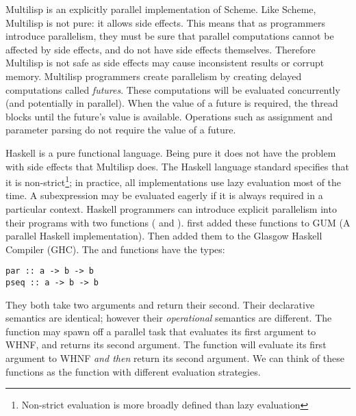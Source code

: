 Multilisp \citep*{halstead:1984:multilisp,halstead:1985:multilisp} is an
explicitly parallel implementation of Scheme.
Like Scheme, Multilisp is not pure: it allows side effects.
This means that as programmers introduce parallelism, they must be sure that
parallel computations cannot be affected by side effects,
and do not have side effects themselves.
Therefore Multilisp is not safe as side effects may cause inconsistent
results or corrupt memory.
Multilisp programmers create parallelism by creating delayed computations
called \emph{futures}.
These computations will be evaluated concurrently
(and potentially in parallel).
When the value of a future is required,
the thread blocks until the future's value is available.
Operations such as assignment and parameter parsing do not require the
value of a future.

Haskell is a pure functional language.
Being pure it does not have the problem with side effects that Multilisp
does.
The Haskell language standard specifies that it is non-strict\footnote{
    Non-strict evaluation is more broadly defined than lazy evaluation};
in practice, all implementations use lazy evaluation most of the time.
A subexpression may be evaluated eagerly if it is always required in a
particular context.
Haskell programmers can introduce explicit parallelism into their programs
with two functions ( and ).
\citet{gph:gum}
first added these functions to GUM (A parallel Haskell implementation).
Then \citet{harris:2005:haskell-smp} added them to the
Glasgow Haskell Compiler (GHC).
The  and  functions have the types:

\begin{verbatim}
par :: a -> b -> b
pseq :: a -> b -> b
\end{verbatim}
They both take two arguments and return their second.
Their declarative semantics are identical;
however their \emph{operational} semantics are different.
The  function may spawn off a parallel task that evaluates its
first argument to WHNF,
and returns its second argument.
The  function will evaluate its first argument to WHNF
\emph{and then} return its second argument.
We can think of these functions as the  function
with different evaluation strategies.

